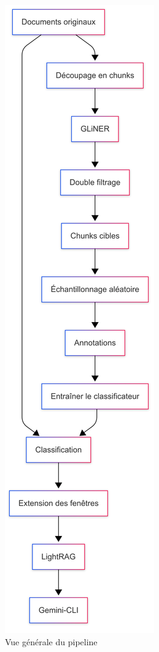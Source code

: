 \documentclass[a4paper,twoside,12pt]{book}
\begin{document}
\begin{figure}
\centering %
\includegraphics[width=\textwidth,height=0.9\textheight,keepaspectratio]{img/pipeline.png}
\caption{Vue générale du pipeline}
\end{figure}
\end{document}
